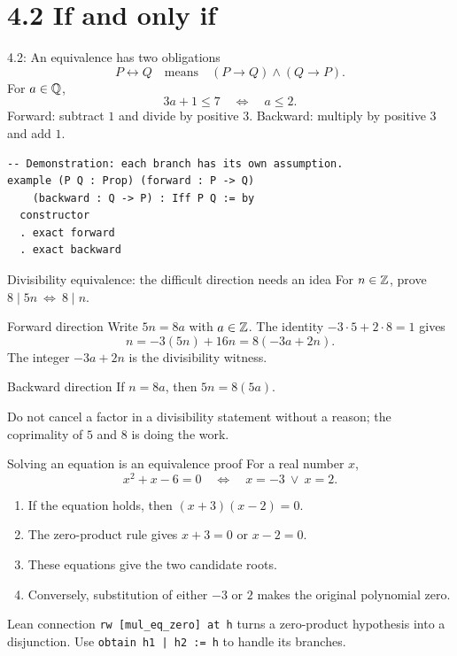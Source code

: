 \section{4.2 If and only if}
\begin{frame}[fragile]{4.2: An equivalence has two obligations}
\[
P\leftrightarrow Q\quad\text{means}\quad(P\to Q)\land(Q\to P).
\]
For $a\in\mathbb{Q}$,
\[
3a+1\le7\quad\Longleftrightarrow\quad a\le2.
\]
Forward: subtract $1$ and divide by positive $3$. Backward: multiply by positive $3$ and add $1$.
\begin{lstlisting}
-- Demonstration: each branch has its own assumption.
example (P Q : Prop) (forward : P -> Q)
    (backward : Q -> P) : Iff P Q := by
  constructor
  . exact forward
  . exact backward
\end{lstlisting}
\end{frame}

\begin{frame}{Divisibility equivalence: the difficult direction needs an idea}
For $n\in\mathbb{Z}$, prove $8\mid5n\ \Longleftrightarrow\ 8\mid n$.
\begin{block}{Forward direction}
Write $5n=8a$ with $a\in\mathbb{Z}$. The identity $-3\cdot5+2\cdot8=1$ gives
\[
n=-3(5n)+16n=8(-3a+2n).
\]
The integer $-3a+2n$ is the divisibility witness.
\end{block}
\begin{block}{Backward direction}
If $n=8a$, then $5n=8(5a)$.
\end{block}
Do not cancel a factor in a divisibility statement without a reason; the coprimality of $5$ and $8$ is doing the work.
\end{frame}

\begin{frame}{Solving an equation is an equivalence proof}
For a real number $x$,
\[
x^2+x-6=0\quad\Longleftrightarrow\quad x=-3\ \lor\ x=2.
\]
\begin{enumerate}
\item If the equation holds, then $(x+3)(x-2)=0$.
\item The zero-product rule gives $x+3=0$ or $x-2=0$.
\item These equations give the two candidate roots.
\item Conversely, substitution of either $-3$ or $2$ makes the original polynomial zero.
\end{enumerate}
\begin{block}{Lean connection}
\texttt{rw [mul\_eq\_zero] at h} turns a zero-product hypothesis into a disjunction. Use \texttt{obtain h1 | h2 := h} to handle its branches.
\end{block}
\end{frame}

